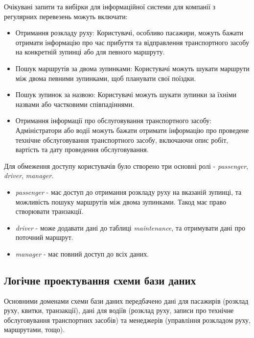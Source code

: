 \documentclass[oneside,14pt]{extarticle}
\begin{document}
Очікувані запити та вибірки для інформаційної системи для компанії з регулярних перевезень можуть включати:
\begin{itemize}
\item Отримання розкладу руху: Користувачі, особливо пасажири, можуть бажати отримати інформацію про час прибуття та відправлення транспортного засобу на конкретній зупинці або для певного маршруту.
\item Пошук маршрутів за двома зупинками: Користувачі можуть шукати маршрути між двома певними зупинками, щоб планувати свої поїздки.
\item Пошук зупинок за назвою: Користувачі можуть шукати зупинки за їхніми назвами або частковими співпадіннями.
\item Отримання інформації про обслуговування транспортного засобу: Адміністратори або водії можуть бажати отримати інформацію про проведене технічне обслуговування транспортного засобу, включаючи опис робіт, вартість та дату проведення обслуговування.
\end{itemize}

Для обмеження доступу користувачів було створено три основні ролі - \textit{passenger}, \textit{driver}, \textit{manager}.

\begin{itemize}
\item \textit{passenger} - має доступ до отримання розкладу руху на вказаній зупинці, та можливість пошуку маршрутів між двома зупинками. Такод має право створювати транзакції.
\item \textit{driver} - може додавати дані до таблиці \textit{maintenance}, та отримувати дані про поточний маршрут.
\item \textit{manager} - має повний доступ до всіх даних.
\end{itemize}

\subsection{Логічне проектування схеми бази даних}
Основними доменами схеми бази даних передбачено дані для пасажирів (розклад руху, квитки, транзакції), дані для водіїв (розклад руху, записи про технічне обслуговування транспортних засобів) та менеджерів (управління розкладом руху, маршрутами, тощо).
\end{document}
